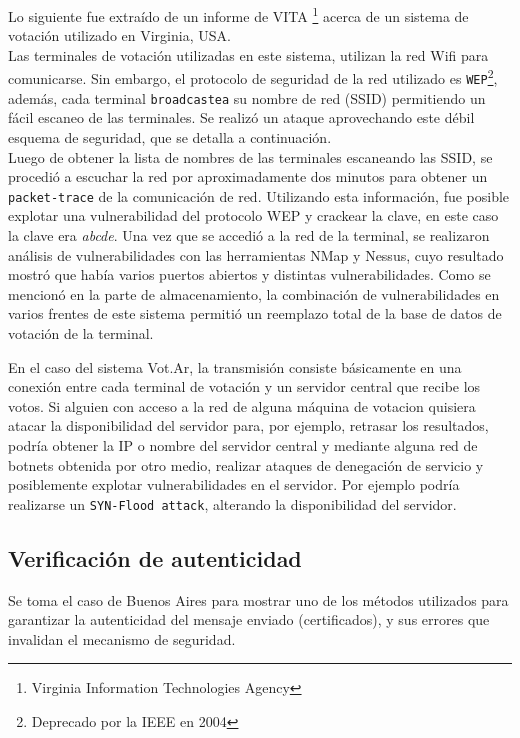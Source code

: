 Lo siguiente fue extraído de un informe de VITA \footnote{Virginia Information Technologies Agency} acerca de un sistema de votación utilizado en Virginia, USA\cite{vita}.\\
Las terminales de votación utilizadas en este sistema, utilizan la red Wifi para comunicarse. Sin embargo, el protocolo de seguridad de la red utilizado es \texttt{WEP}\footnote{Deprecado por la IEEE en 2004}, además, cada terminal \texttt{broadcastea} su nombre de red (SSID) permitiendo un fácil escaneo de las terminales. Se realizó un ataque aprovechando este débil esquema de seguridad, que se detalla a continuación.\\
Luego de obtener la lista de nombres de las terminales escaneando las SSID, se procedió a escuchar la red por aproximadamente dos minutos para obtener un \texttt{packet-trace} de la comunicación de red. Utilizando esta información, fue posible explotar una vulnerabilidad del protocolo WEP y crackear la clave, en este caso la clave era \textit{abcde}. Una vez que se accedió a la red de la terminal, se realizaron análisis de vulnerabilidades con las herramientas NMap\cite{nmap} y Nessus\cite{nessus}, cuyo resultado mostró que había varios puertos abiertos y distintas vulnerabilidades. Como se mencionó en la parte de almacenamiento, la combinación de vulnerabilidades en varios frentes de este sistema permitió un reemplazo total de la base de datos de votación de la terminal.


En el caso del sistema Vot.Ar, la transmisión consiste básicamente en una conexión entre cada terminal de votación y un servidor central que recibe los votos. Si alguien con acceso a la red de alguna máquina de votacion quisiera atacar la disponibilidad del servidor para, por ejemplo, retrasar los resultados, podría obtener la IP o nombre del servidor central y mediante alguna red de botnets obtenida por otro medio, realizar ataques de denegación de servicio y posiblemente explotar vulnerabilidades en el servidor. Por ejemplo podría realizarse un \texttt{SYN-Flood attack}, alterando la disponibilidad del servidor.


\subsection{Verificación de autenticidad}

Se toma el caso de Buenos Aires para mostrar uno de los métodos utilizados para garantizar la autenticidad del mensaje enviado (certificados), y sus errores que invalidan el mecanismo de seguridad.


